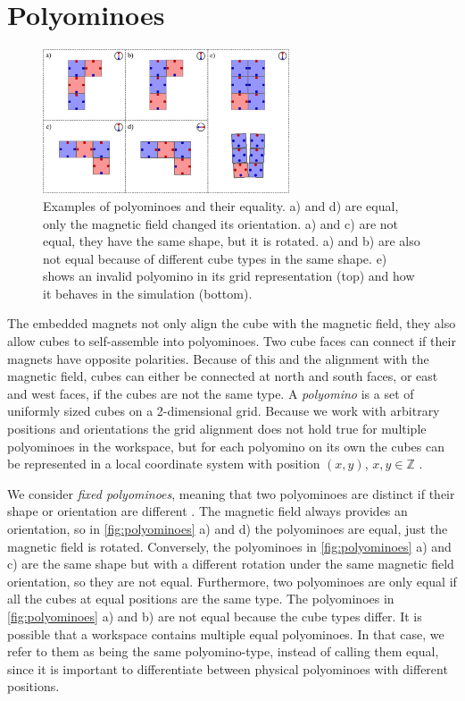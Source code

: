 \section{Polyominoes}
\label{sec:polys}

\begin{figure}
	\centering
	\includegraphics[width=0.65\textwidth]{figures/polyominoes.pdf}
	\caption[Examples of Polyominoes and their equality]{Examples of polyominoes and their equality. a) and d) are equal, only the magnetic field changed its orientation. a) and c) are not equal, they have the same shape, but it is rotated. a) and b) are also not equal because of different cube types in the same shape. e) shows an invalid polyomino in its grid representation (top) and how it behaves in the simulation (bottom).}
	\label{fig:polyominoes}
\end{figure}

The embedded magnets not only align the cube with the magnetic field, they also allow cubes to self-assemble into polyominoes.
Two cube faces can connect if their magnets have opposite polarities.
Because of this and the alignment with the magnetic field, cubes can either be connected at north and south faces, or east and west faces, if the cubes are not the same type.
A \textit{polyomino} is a set of uniformly sized cubes on a 2-dimensional grid.
Because we work with arbitrary positions and orientations the grid alignment does not hold true for multiple polyominoes in the workspace, but for each polyomino on its own the cubes can be represented in a local coordinate system with position $(x,y)$, $x,y \in \mathbb{Z}$ \cite{Lu2021}.

We consider \textit{fixed polyominoes}, meaning that two polyominoes are distinct if their shape or orientation are different \cite{Lu2021}.
The magnetic field always provides an orientation, so in \autoref{fig:polyominoes} a) and d) the polyominoes are equal, just the magnetic field is rotated.
Conversely, the polyominoes in \autoref{fig:polyominoes} a) and c) are the same shape but with a different rotation under the same magnetic field orientation, so they are not equal.
Furthermore, two polyominoes are only equal if all the cubes at equal positions are the same type.
The polyominoes in \autoref{fig:polyominoes} a) and b) are not equal because the cube types differ.
It is possible that a workspace contains multiple equal polyominoes.
In that case, we refer to them as being the same polyomino-type, instead of calling them equal, since it is important to differentiate between physical polyominoes with different positions.

